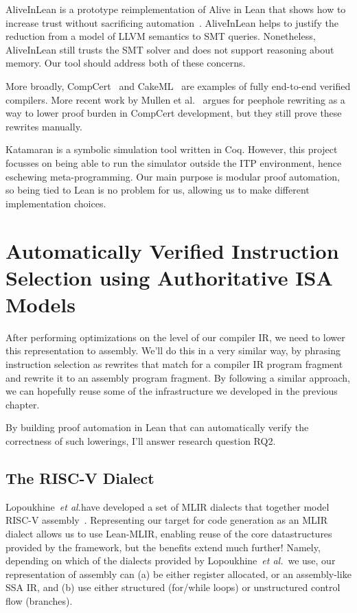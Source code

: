 \documentclass[a4paper]{scrartcl}
\newcommand*{\etal}{~\emph{et al.}}
\begin{document}
AliveInLean is a prototype reimplementation of Alive in Lean that shows how to increase trust without
sacrificing automation~\cite{leeAliveInLeanVerifiedLLVM2019}. AliveInLean helps to justify the reduction from a model of LLVM semantics
to SMT queries. Nonetheless, AliveInLean still trusts the SMT solver and does not support reasoning about memory. 
Our tool should address both of these concerns.

More broadly, CompCert~\cite{leroyCompCertFormallyVerified} and
CakeML~\cite{kumarCakeMLVerifiedImplementation2014} are examples
of fully end-to-end verified compilers. More recent work by Mullen et
al.~\cite{mullenVerifiedPeepholeOptimizations2016} argues for
peephole rewriting as a way to lower proof burden in CompCert
development, but they still prove these rewrites manually.

Katamaran \cite{keuchelVerifiedSymbolicExecution2022} is a
symbolic simulation tool written in Coq. However, this
project focusses on being able to run the simulator outside the ITP
environment, hence eschewing meta-programming. Our main purpose is
modular proof automation, so being tied to Lean is no problem for us,
allowing us to make different implementation choices.

\section{Automatically Verified Instruction Selection using
Authoritative ISA Models}\label{scaling-high-assurance-translation-validation-to-authoritative-isa-models}

After performing optimizations on the level of our compiler IR, we need
to lower this representation to assembly. We'll do this in a very
similar way, by phrasing instruction selection as rewrites that match
for a compiler IR program fragment and rewrite it to an assembly program
fragment. By following a similar approach, we can hopefully reuse some
of the infrastructure we developed in the previous chapter.

By building proof automation in Lean that can automatically verify the correctness of
such lowerings, I'll answer research question \textsc{RQ2}.

\subsection{The RISC-V Dialect}\label{the-risc-v-dialect}

Lopoukhine\etal{}have developed a set of MLIR
dialects that together model RISC-V assembly~\cite{lopoukhineMultiLevelCompilerBackend}. Representing our target
for code generation as an MLIR dialect allows us to use Lean-MLIR,
enabling reuse of the core datastructures provided by the framework, but
the benefits extend much further! Namely, depending on which of the
dialects provided by Lopoukhine\etal{}~we use, our representation of
assembly can (a) be either register allocated, or an assembly-like
SSA IR, and (b) use either structured (for/while loops) or unstructured
control flow (branches).
\end{document}
